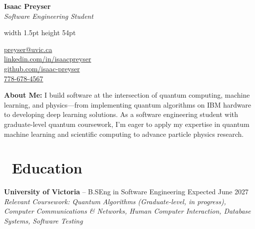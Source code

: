 \documentclass[11pt]{article}
\begin{document}
\noindent
\begin{minipage}[c]{0.55\textwidth}
    {\Huge\textbf{\color{primaryColor} Isaac Preyser}} \\[4pt]
    {\Large\textsl{Software Engineering Student}}
\end{minipage}%
\begin{minipage}[c]{0.05\textwidth}
    \centering
    {\color{primaryColor}\vrule width 1.5pt height 54pt}
\end{minipage}%
\begin{minipage}[c]{0.4\textwidth}
    \small
    \makebox[16pt][c]{\faEnvelope} \space \href{mailto:preyser@uvic.ca}{preyser@uvic.ca} \\
    \makebox[16pt][c]{\faLinkedin} \space \href{https://www.linkedin.com/in/isaacpreyser}{linkedin.com/in/isaacpreyser} \\
    \makebox[16pt][c]{\faGithub} \space \href{https://github.com/isaac-preyser}{github.com/isaac-preyser} \\
    \makebox[16pt][c]{\faMobile} \space \href{tel:778-678-4567}{778-678-4567}
\end{minipage}
\vspace{2pt}    

\begin{tcolorbox}[colback=primaryColor!5!white, colframe=white, arc=2mm, boxrule=0pt, left=8pt, right=8pt, top=4pt, bottom=4pt]
    \small\color{black}
    \textbf{About Me:} I build software at the intersection of quantum computing, machine learning, and physics—from implementing quantum algorithms on IBM hardware to developing deep learning solutions. As a software engineering student with graduate-level quantum coursework, I'm eager to apply my expertise in quantum machine learning and scientific computing to advance particle physics research.
\end{tcolorbox}
\vspace{-10pt}

\section*{\faGraduationCap\ Education}
\textbf{University of Victoria} -- B.SEng in Software Engineering \hfill Expected June 2027 \\
\vspace{1pt}
\footnotesize \textit{Relevant Coursework: Quantum Algorithms (Graduate-level, in progress), Computer Communications \& Networks, Human Computer Interaction, Database Systems, Software Testing}
\vspace{-10pt}
\end{document}
